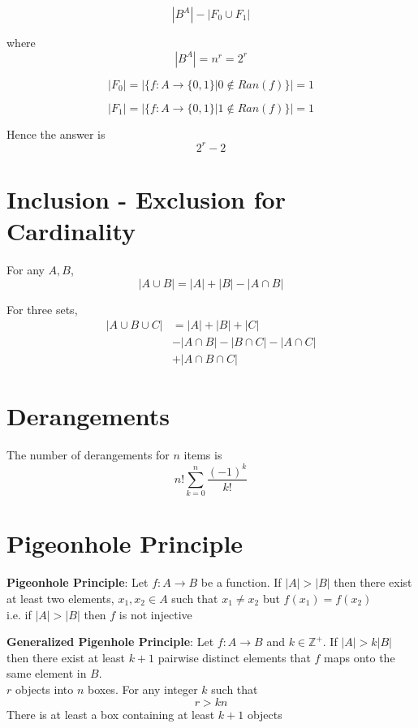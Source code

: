 \[
  |B^A| - |F_0 \cup F_1| 
\] 

where 
\[
  |B^A| = n^r = 2^r
\] 

\[
  |F_0| = \left| \{ f : A \rightarrow \{ 0, 1 \} | 0 \notin Ran(f) \}  \right|  = 1
\] 

\[
  |F_1| = \left| \{ f : A \rightarrow \{ 0, 1 \} | 1 \notin Ran(f) \}  \right|  = 1
\] 


Hence the answer is 
\[
  2^r - 2
\] 

\section{Inclusion - Exclusion for Cardinality}

\begin{framed}
   For any $A, B$, 
   \[
     |A \cup B| = |A| + |B| - |A \cap B|
   \] 

   For three sets,
   \begin{align*}
      |A \cup B \cup C| &= |A| + |B| + |C|  \\
                        &- |A \cap B| - |B \cap C| - |A \cap C| \\
                        &+ |A \cap B \cap C|
   \end{align*}
  
\end{framed}

\section{Derangements}

The number of derangements for $n$ items is
\[
   n! \sum_{k = 0}^{n} \frac{(-1)^k}{k!}
\] 


\section{Pigeonhole Principle}

\begin{framed}
   \textbf{Pigeonhole Principle}: Let $f: A \rightarrow B$ be a function. If $|A| > |B|$ then there exist at least two elements, $x_1, x_2 \in A$ such that $x_1 \neq x_2$ but $f(x_1) = f(x_2)$ \\

   i.e. if $|A| > |B|$ then $f$ is not injective
\end{framed}

\begin{framed}
   \textbf{Generalized Pigenhole Principle}: Let  $f: A \rightarrow B$ and $k \in \mathbb{Z}^+$. If $|A| > k|B|$ then there exist at least $k + 1$ pairwise distinct elements that $f$ maps onto the same element in $B$. \\

   $r$ objects into $n$ boxes. For any integer $k$ such that
   \[
      r > k n
   \] 
   There is at least a box containing at least $k + 1$ objects
  
\end{framed}

